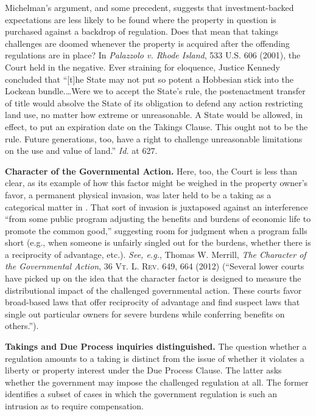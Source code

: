 Michelman's argument, and some precedent, suggests that investment-backed
expectations are less likely to be found where the property in question is
purchased against a backdrop of regulation. Does that mean that takings
challenges are doomed whenever the property is acquired after the offending
regulations are in place? In \textit{Palazzolo v. Rhode Island}, 533 U.S. 606
(2001), the Court held in the negative. Ever straining for eloquence, Justice
Kennedy concluded that ``[t]he State may not put so potent a Hobbesian stick
into the Lockean bundle.\ldots Were we to accept the State's rule, the
postenactment transfer of title would absolve the State of its obligation to
defend any action restricting land use, no matter how extreme or unreasonable. A
State would be allowed, in effect, to put an expiration date on the Takings
Clause. This ought not to be the rule. Future generations, too, have a right to
challenge unreasonable limitations on the use and value of land.'' \textit{Id.}
at 627.


\item \textbf{Character of the Governmental Action.} Here, too, the Court is
less than clear, as its example of how this factor might be weighed in the
property owner's favor, a permanent physical invasion, was later held to be a
taking as a categorical matter in
. That sort of invasion is
juxtaposed against an interference ``from some public program adjusting the
benefits and burdens of economic life to promote the common good,'' suggesting
room for judgment when a program falls short (e.g., when someone is unfairly
singled out for the burdens, whether there is a reciprocity of advantage, etc.).
\textit{See, e.g.}, Thomas W. Merrill, \textit{The Character of the Governmental
Action}, 36 \textsc{Vt. L. Rev}. 649, 664 (2012) (``Several lower courts have
picked up on the idea that the character factor is designed to measure the
distributional impact of the challenged governmental action. These courts favor
broad-based laws that offer reciprocity of advantage and find suspect laws that
single out particular owners for severe burdens while conferring benefits on
others.'').

\item \textbf{Takings and Due Process inquiries distinguished.} The question
whether a regulation amounts to a taking is distinct from the issue of whether
it violates a liberty or property interest under the Due Process Clause. The
latter asks whether the government may impose the challenged regulation at all.
The former identifies a subset of cases in which the government regulation is
such an intrusion as to require compensation.


